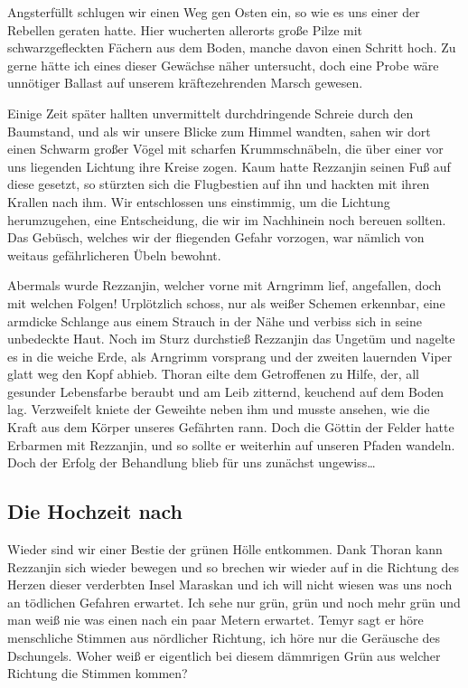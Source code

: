 Angsterfüllt schlugen wir einen Weg gen Osten ein, so wie es uns einer der Rebellen geraten hatte. Hier wucherten allerorts große Pilze mit schwarzgefleckten Fächern aus dem Boden, manche davon einen Schritt hoch. Zu gerne hätte ich eines dieser Gewächse näher untersucht, doch eine Probe wäre unnötiger Ballast auf unserem kräftezehrenden Marsch gewesen. 

Einige Zeit später hallten unvermittelt durchdringende Schreie durch den Baumstand, und als wir unsere Blicke zum Himmel wandten, sahen wir dort einen Schwarm großer Vögel mit scharfen Krummschnäbeln, die über einer vor uns liegenden Lichtung ihre Kreise zogen. Kaum hatte Rezzanjin seinen Fuß auf diese gesetzt, so stürzten sich die Flugbestien auf ihn und hackten mit ihren Krallen nach ihm. Wir entschlossen uns einstimmig, um die Lichtung herumzugehen, eine Entscheidung, die wir im Nachhinein noch bereuen sollten. Das Gebüsch, welches wir der fliegenden Gefahr vorzogen, war nämlich von weitaus gefährlicheren Übeln bewohnt. 

Abermals wurde Rezzanjin, welcher vorne mit Arngrimm lief, angefallen, doch mit welchen Folgen! Urplötzlich schoss, nur als weißer Schemen erkennbar, eine armdicke Schlange aus einem Strauch in der Nähe und verbiss sich in seine unbedeckte Haut. Noch im Sturz durchstieß Rezzanjin das Ungetüm und nagelte es in die weiche Erde, als Arngrimm vorsprang und der zweiten lauernden Viper glatt weg den Kopf abhieb. Thoran eilte dem Getroffenen zu Hilfe, der, all gesunder Lebensfarbe beraubt und am Leib zitternd, keuchend auf dem Boden lag. Verzweifelt kniete der Geweihte neben ihm und musste ansehen, wie die Kraft aus dem Körper unseres Gefährten rann. Doch die Göttin der Felder hatte Erbarmen mit Rezzanjin, und so sollte er weiterhin auf unseren Pfaden wandeln. Doch der Erfolg der Behandlung blieb für uns zunächst ungewiss…

\subsection{Die Hochzeit nach }

Wieder sind wir einer Bestie der grünen Hölle entkommen. Dank Thoran kann Rezzanjin sich wieder bewegen und so brechen wir wieder auf in die Richtung des Herzen dieser verderbten Insel Maraskan und ich will nicht wiesen was uns noch an tödlichen Gefahren erwartet. Ich sehe nur grün, grün und noch mehr grün und man weiß nie was einen nach ein paar Metern erwartet. 
Temyr sagt er höre menschliche Stimmen aus nördlicher Richtung, ich höre nur die Geräusche des Dschungels. Woher weiß er eigentlich bei diesem dämmrigen Grün aus welcher Richtung die Stimmen kommen?

